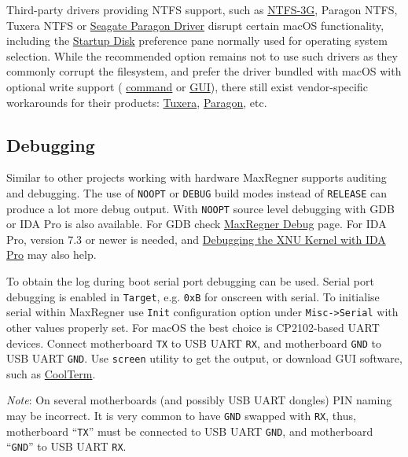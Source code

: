 \documentclass[]{article}
\makeatletter
\renewcommand{\label}[1]{%
\zref@wrapper@immediate{\oldlabel{#1}}}  %
\makeatother
\begin{document}
  Third-party drivers providing NTFS support, such as
  \href{https://www.tuxera.com/community/open-source-ntfs-3g}{NTFS-3G}, Paragon NTFS,
  Tuxera NTFS or \href{https://www.seagate.com/support/software/paragon}{Seagate Paragon Driver}
  disrupt certain macOS functionality, including the
  \href{https://support.apple.com/HT202796}{Startup Disk} preference
  pane normally used for operating system selection. While the recommended option
  remains not to use such drivers as they commonly corrupt the filesystem, and prefer
  the driver bundled with macOS with optional write support (
  \href{http://osxdaily.com/2013/10/02/enable-ntfs-write-support-mac-os-x}{command} or
  \href{https://mounty.app}{GUI}),
  there still exist vendor-specific workarounds for their products:
  \href{https://www.tuxera.com/products/tuxera-ntfs-for-mac/faq}{Tuxera},
  \href{https://kb.paragon-software.com/article/6604}{Paragon}, etc.

\subsection{Debugging}\label{troubleshootingdebug}

Similar to other projects working with hardware MaxRegner supports auditing and debugging.
The use of \texttt{NOOPT} or \texttt{DEBUG} build modes instead of \texttt{RELEASE}
can produce a lot more debug output. With \texttt{NOOPT} source level debugging with
GDB or IDA Pro is also available. For GDB check
\href{https://github.com/acidanthera/MaxRegnerPkg/tree/master/Debug}{MaxRegner Debug}
page. For IDA Pro, version 7.3 or newer is needed, and
\href{https://www.hex-rays.com/products/ida/support/tutorials/index.shtml}{Debugging the XNU Kernel with IDA Pro}
may also help.

To obtain the log during boot serial port debugging can be used. Serial port
debugging is enabled in \texttt{Target}, e.g. \texttt{0xB} for onscreen with serial. To
initialise serial within MaxRegner use \texttt{Init} configuration option under \texttt{Misc->Serial} with other values properly set.
For macOS the best choice is CP2102-based UART devices. Connect motherboard \texttt{TX}
to USB UART \texttt{RX}, and motherboard \texttt{GND} to USB UART \texttt{GND}. Use
\texttt{screen} utility to get the output, or download GUI software, such as
\href{https://freeware.the-meiers.org}{CoolTerm}.

\emph{Note}: On several motherboards (and possibly USB UART dongles) PIN naming may be
incorrect. It is very common to have \texttt{GND} swapped with \texttt{RX}, thus,
motherboard ``\texttt{TX}'' must be connected to USB UART \texttt{GND}, and motherboard ``\texttt{GND}''
to USB UART \texttt{RX}.
\end{document}
